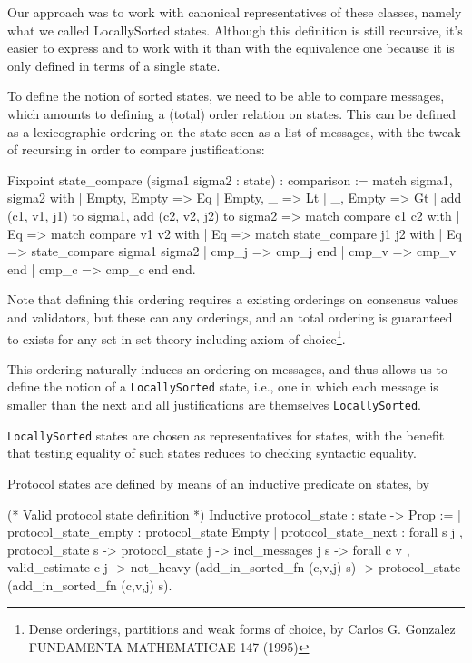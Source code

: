 Our approach was to work with canonical representatives of these classes,
namely what we called LocallySorted states.  Although this definition
is still recursive, it's easier to express and to work with it than with the
equivalence one because it is only defined in terms of a single state.

To define the notion of sorted states, we need to be able to compare messages,
which amounts to defining a (total) order relation on states.
This can be defined as a lexicographic ordering on the state seen as a list
of messages, with the tweak of recursing in order to compare justifications:

\begin{coq}
Fixpoint state_compare (sigma1 sigma2 : state) : comparison :=
  match sigma1, sigma2 with
  | Empty, Empty => Eq
  | Empty, _ => Lt
  | _, Empty => Gt
  | add (c1, v1, j1) to sigma1, add (c2, v2, j2) to sigma2 =>
    match compare c1 c2 with
    | Eq =>
      match compare v1 v2 with
      | Eq =>
        match state_compare j1 j2 with
        | Eq => state_compare sigma1 sigma2
        | cmp_j => cmp_j
        end
      | cmp_v => cmp_v
      end
    | cmp_c => cmp_c
    end
  end.
\end{coq}

Note that defining this ordering requires a existing orderings on
consensus values and validators, but these can any orderings,
and an total ordering is guaranteed to exists for any set in set theory
including axiom of choice\footnote{Dense orderings, partitions and weak
forms of choice, by Carlos G. Gonzalez FUNDAMENTA MATHEMATICAE 147 (1995)}.
    
This ordering naturally induces an ordering on messages, and thus allows us
to define the notion of a \verb"LocallySorted" state, i.e., one in which
each message is smaller than the next and all justifications are themselves
\verb"LocallySorted".

\verb"LocallySorted" states are chosen as representatives for states, with the
benefit that testing equality of such states reduces to checking syntactic
equality.

Protocol states are defined by means of an inductive predicate on states, by

\begin{coq}
(* Valid protocol state definition *) 
Inductive protocol_state : state -> Prop :=
  | protocol_state_empty : protocol_state Empty
  | protocol_state_next
         : forall s j
         , protocol_state s
        -> protocol_state j
        -> incl_messages j s
        -> forall c v
         , valid_estimate c j
        -> not_heavy (add_in_sorted_fn (c,v,j) s)
        -> protocol_state (add_in_sorted_fn (c,v,j) s).
\end{coq}

